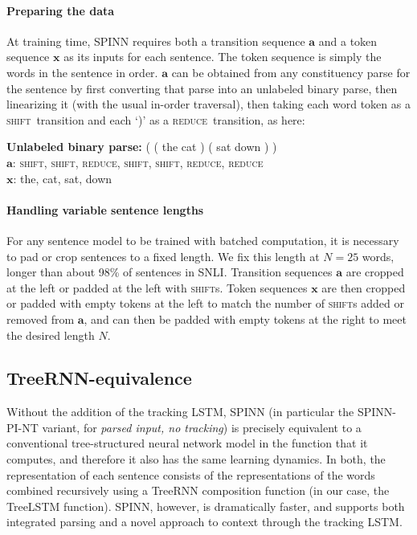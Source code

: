 \documentclass[11pt]{article}
\newcommand{\shift}{\textsc{shift}}
\newcommand{\reduce}{\textsc{reduce}}
\begin{document}
\paragraph{Preparing the data} At training time, SPINN requires both a transition sequence $\mathbf a$  and a token sequence $\mathbf x$ as its inputs for each sentence. The token sequence is simply the words in the sentence in order. $\mathbf a$ can be obtained from any constituency parse for the sentence by first converting that parse into an unlabeled binary parse, then linearizing it (with the usual in-order traversal), then taking each word token as a \shift\ transition and each `)' as a \reduce\ transition, as here:

\vspace{0.5em}
{\noindent\small
{\bf Unlabeled binary parse:} ( ( the cat ) ( sat down ) )\\
{$\mathbf a$}: \shift, \shift, \reduce, \shift, \shift, \reduce, \reduce\\
{$\mathbf x$}: the, cat, sat, down
}

\paragraph{Handling variable sentence lengths} For any sentence model to be trained with batched computation, it is necessary to pad or crop sentences to a fixed length. We fix this length at $N = 25$ words, longer than about 98\% of sentences in SNLI\@. Transition sequences $\mathbf a$ are cropped at the left or padded at the left with \shift s. Token sequences $\mathbf x$ are then cropped or padded with empty tokens at the left to match the number of \shift s added or removed from $\mathbf a$, and can then be padded with empty tokens at the right to meet the desired length $N$.


\subsection{TreeRNN-equivalence}

Without the addition of the tracking LSTM, SPINN (in particular the SPINN-PI-NT variant, for \textit{parsed input, no tracking}) is precisely equivalent to a conventional tree-structured neural network model in the function that it computes, and therefore it also has the same learning dynamics. In both, the representation of each sentence consists of the representations of the words combined recursively using a TreeRNN composition function (in our case, the TreeLSTM function). SPINN, however, is dramatically faster, and supports both integrated parsing and a novel approach to context through the tracking LSTM.
\end{document}
